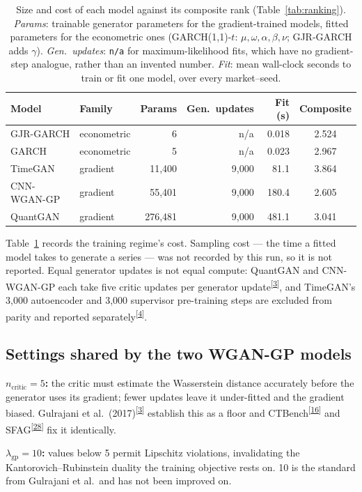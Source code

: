 \documentclass[11pt,a4paper]{article}
\makeatletter
\newcommand{\tcite}[1]{\textsuperscript{[\hyperlink{R:#1}{#1}]}}
\DeclareRobustCommand{\_}{\ifmmode\nfss@text{\textunderscore}\else\textunderscore\allowbreak\fi}
\makeatother
\begin{document}
\begin{table}[htbp]
\centering
\caption{Size and cost of each model against its composite rank (Table~\ref{tab:ranking}). \emph{Params}: trainable generator parameters for the gradient-trained models, fitted parameters for the econometric ones (GARCH(1,1)-$t$: $\mu,\omega,\alpha,\beta,\nu$; GJR-GARCH adds $\gamma$). \emph{Gen.\ updates}: \texttt{n/a} for maximum-likelihood fits, which have no gradient-step analogue, rather than an invented number. \emph{Fit}: mean wall-clock seconds to train or fit one model, over every market--seed.}
\label{tab:compute}
\begin{tabular}{@{}llrrrc@{}}
\toprule
Model & Family & Params & Gen.\ updates & Fit (s) & Composite \\
\midrule
GJR-GARCH & econometric & 6 & n/a & 0.018 & 2.524 \\
GARCH & econometric & 5 & n/a & 0.023 & 2.967 \\
TimeGAN & gradient & 11,400 & 9,000 & 81.1 & 3.864 \\
CNN-WGAN-GP & gradient & 55,401 & 9,000 & 180.4 & 2.605 \\
QuantGAN & gradient & 276,481 & 9,000 & 481.1 & 3.041 \\
\bottomrule
\end{tabular}
\end{table}

Table~\ref{tab:compute} records the training regime's cost. Sampling cost --- the time a fitted model takes to generate a series --- was not recorded by this run, so it is not reported. Equal generator updates is not equal compute: QuantGAN and CNN-WGAN-GP each take five critic updates per generator update\tcite{3}, and TimeGAN's 3,000 autoencoder and 3,000 supervisor pre-training steps are excluded from parity and reported separately\tcite{4}.

\subsection{Settings shared by the two WGAN-GP models}
\textbf{$n_\text{critic}=5$:} the critic must estimate the Wasserstein distance accurately before the generator uses its gradient; fewer updates leave it under-fitted and the gradient biased. Gulrajani et al.\ (2017)\tcite{3} establish this as a floor and CTBench\tcite{16} and SFAG\tcite{28} fix it identically.

\textbf{$\lambda_\text{gp}=10$:} values below 5 permit Lipschitz violations, invalidating the Kantorovich--Rubinstein duality the training objective rests on. 10 is the standard from Gulrajani et al.\ and has not been improved on.
\end{document}
